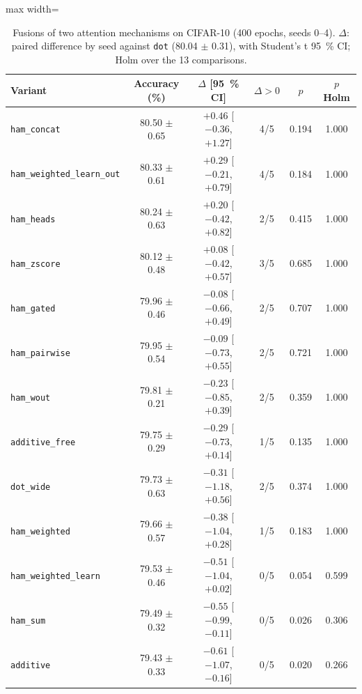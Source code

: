 
\begin{table}[!t]
\centering
\small
\caption{Fusions of two attention mechanisms on CIFAR-10 (400 epochs, seeds 0--4). $\Delta$: paired difference by seed against \texttt{dot} (80.04 $\pm$ 0.31), with Student's t 95~\% CI; Holm over the 13 comparisons.}
\label{tab:fusiones}
\begin{adjustbox}{max width=\linewidth}
\begin{tabular}{lccccc}
\toprule
Variant & Accuracy (\%) & $\Delta$ [95~\% CI] & $\Delta>0$ & $p$ & $p$ Holm \\
\midrule
\texttt{ham\_concat} & 80.50 $\pm$ 0.65 & $+0.46$ [$-0.36$, $+1.27$] & 4/5 & 0.194 & 1.000 \\
\texttt{ham\_weighted\_learn\_out} & 80.33 $\pm$ 0.61 & $+0.29$ [$-0.21$, $+0.79$] & 4/5 & 0.184 & 1.000 \\
\texttt{ham\_heads} & 80.24 $\pm$ 0.63 & $+0.20$ [$-0.42$, $+0.82$] & 2/5 & 0.415 & 1.000 \\
\texttt{ham\_zscore} & 80.12 $\pm$ 0.48 & $+0.08$ [$-0.42$, $+0.57$] & 3/5 & 0.685 & 1.000 \\
\texttt{ham\_gated} & 79.96 $\pm$ 0.46 & $-0.08$ [$-0.66$, $+0.49$] & 2/5 & 0.707 & 1.000 \\
\texttt{ham\_pairwise} & 79.95 $\pm$ 0.54 & $-0.09$ [$-0.73$, $+0.55$] & 2/5 & 0.721 & 1.000 \\
\texttt{ham\_wout} & 79.81 $\pm$ 0.21 & $-0.23$ [$-0.85$, $+0.39$] & 2/5 & 0.359 & 1.000 \\
\texttt{additive\_free} & 79.75 $\pm$ 0.29 & $-0.29$ [$-0.73$, $+0.14$] & 1/5 & 0.135 & 1.000 \\
\texttt{dot\_wide} & 79.73 $\pm$ 0.63 & $-0.31$ [$-1.18$, $+0.56$] & 2/5 & 0.374 & 1.000 \\
\texttt{ham\_weighted} & 79.66 $\pm$ 0.57 & $-0.38$ [$-1.04$, $+0.28$] & 1/5 & 0.183 & 1.000 \\
\texttt{ham\_weighted\_learn} & 79.53 $\pm$ 0.46 & $-0.51$ [$-1.04$, $+0.02$] & 0/5 & 0.054 & 0.599 \\
\texttt{ham\_sum} & 79.49 $\pm$ 0.32 & $-0.55$ [$-0.99$, $-0.11$] & 0/5 & 0.026 & 0.306 \\
\texttt{additive} & 79.43 $\pm$ 0.33 & $-0.61$ [$-1.07$, $-0.16$] & 0/5 & 0.020 & 0.266 \\
\bottomrule
\end{tabular}
\end{adjustbox}
\end{table}
